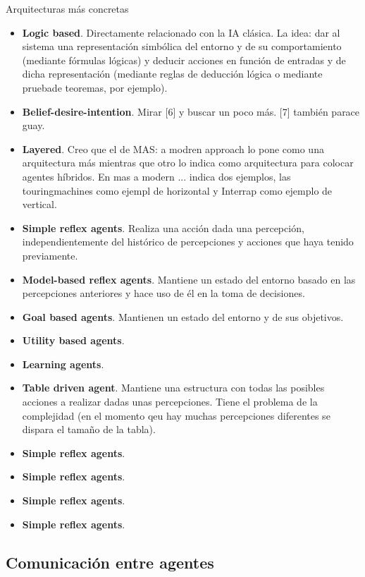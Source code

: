 Arquitecturas más concretas

\begin{itemize}
	\item \textbf{Logic based}. Directamente relacionado con la IA clásica. La idea: dar al sistema una representación simbólica del entorno y de su comportamiento (mediante fórmulas lógicas) y deducir acciones en función de entradas y de dicha representación (mediante reglas de deducción lógica o mediante pruebade teoremas, por ejemplo).
	\item \textbf{Belief-desire-intention}. Mirar [6] y buscar un poco más. [7] también parace guay.
	\item \textbf{Layered}. Creo que el de MAS: a modren approach lo pone como una arquitectura más mientras que otro lo indica como arquitectura para colocar agentes híbridos. En mas a modern ... indica dos ejemplos, las touringmachines como ejempl de horizontal y Interrap como ejemplo de vertical.
	\item \textbf{Simple reflex agents}. Realiza una acción dada una percepción, independientemente del histórico de percepciones y acciones que haya tenido previamente.
	\item \textbf{Model-based reflex agents}. Mantiene un estado del entorno basado en las percepciones anteriores y hace uso de él en la toma de decisiones.
	\item \textbf{Goal based agents}. Mantienen un estado del entorno y de sus objetivos.
	\item \textbf{Utility based agents}.
	\item \textbf{Learning agents}.
	\item \textbf{Table driven agent}. Mantiene una estructura con todas las posibles acciones a realizar dadas unas percepciones. Tiene el problema de la complejidad (en el momento qeu hay muchas percepciones diferentes se dispara el tamaño de la tabla).
	\item \textbf{Simple reflex agents}.
	\item \textbf{Simple reflex agents}.
	\item \textbf{Simple reflex agents}.
	\item \textbf{Simple reflex agents}.
\end{itemize}

\subsection{Comunicación entre agentes}

